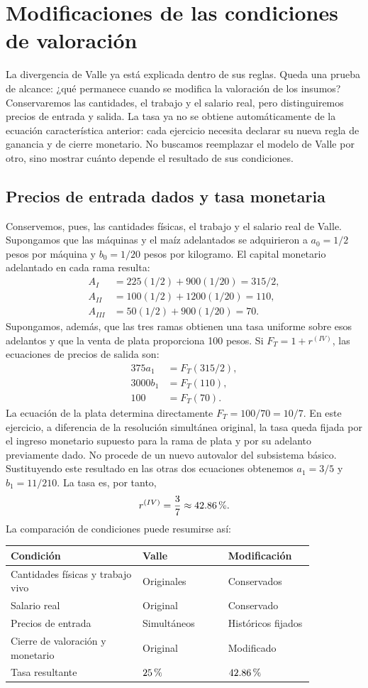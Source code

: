 \documentclass[10pt,twoside]{article}
\newcommand{\pct}{\ifmmode\text{\char37}\else\char37\fi}
\begin{document}
\section{Modificaciones de las condiciones de valoración}
La divergencia de Valle ya está explicada dentro de sus reglas. Queda una prueba de alcance: ¿qué permanece cuando se modifica la valoración de los insumos? Conservaremos las cantidades, el trabajo y el salario real, pero distinguiremos precios de entrada y salida. La tasa ya no se obtiene automáticamente de la ecuación característica anterior: cada ejercicio necesita declarar su nueva regla de ganancia y de cierre monetario. No buscamos reemplazar el modelo de Valle por otro, sino mostrar cuánto depende el resultado de sus condiciones.

\subsection*{Precios de entrada dados y tasa monetaria}
Conservemos, pues, las cantidades físicas, el trabajo y el salario real de Valle. Supongamos que las máquinas y el maíz adelantados se adquirieron a $a_0=1/2$ pesos por máquina y $b_0=1/20$ pesos por kilogramo. El capital monetario adelantado en cada rama resulta:
\[
\begin{aligned}A_I&=225(1/2)+900(1/20)=315/2,\\A_{II}&=100(1/2)+1200(1/20)=110,\\A_{III}&=50(1/2)+900(1/20)=70.\end{aligned}
\]
Supongamos, además, que las tres ramas obtienen una tasa uniforme sobre esos adelantos y que la venta de plata proporciona 100 pesos. Si $F_T=1+r^{(IV)}$, las ecuaciones de precios de salida son:
\begin{align*}
375a_1&=F_T(315/2),\\
3000b_1&=F_T(110),\\
100&=F_T(70).
\end{align*}
La ecuación de la plata determina directamente $F_T=100/70=10/7$. En este ejercicio, a diferencia de la resolución simultánea original, la tasa queda fijada por el ingreso monetario supuesto para la rama de plata y por su adelanto previamente dado. No procede de un nuevo autovalor del subsistema básico. Sustituyendo este resultado en las otras dos ecuaciones obtenemos $a_1=3/5$ y $b_1=11/210$. La tasa es, por tanto,
\[
r^{(IV)}=\frac37\approx42.86\,\pct.
\]
La comparación de condiciones puede resumirse así:
\begin{center}
\begin{tabular}{@{}p{0.37\linewidth}p{0.24\linewidth}p{0.24\linewidth}@{}}
\toprule
Condición & Valle & Modificación\\\midrule
Cantidades físicas y trabajo vivo & Originales & Conservados\\
Salario real & Original & Conservado\\
Precios de entrada & Simultáneos & Históricos fijados\\
Cierre de valoración y monetario & Original & Modificado\\
Tasa resultante & $25\,\pct$ & $42.86\,\pct$\\\bottomrule
\end{tabular}
\end{center}
\end{document}
